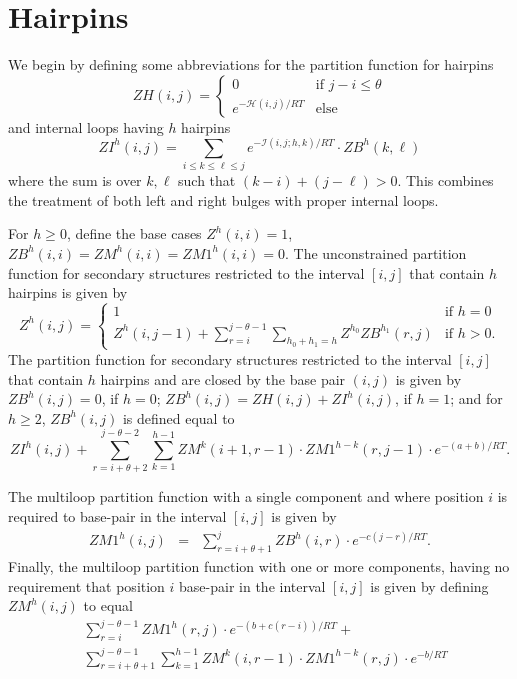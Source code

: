 \section{Hairpins}
\label{section:hairpinPartitionFunction}



We begin by defining some abbreviations for the partition function for
hairpins
\[
ZH(i,j) =
\left\{ \begin{array}{ll}
0 &\mbox{if $j-i \leq \theta$}\\
e^{-\mathcal{H}(i,j)/RT} &\mbox{else}
\end{array} \right.
\]
and internal loops having $h$ hairpins
\[
ZI^h(i,j) =  \displaystyle\sum_{i \leq k \leq \ell \leq j}
e^{-\mathcal{I}(i,j;h,k)/RT} \cdot ZB^h(k,\ell)
\]
where the sum is over $k,\ell$ such that $(k-i)+(j-\ell)>0$. This combines the
treatment of both left and right bulges with proper internal loops.

For $h\geq 0$, define the base cases $Z^h(i,i)=1$,
$ZB^h(i,i)= ZM^h(i,i)= ZM1^h(i,i)=0$.
The unconstrained partition function for secondary structures
restricted to the interval $[i,j]$ that contain $h$ hairpins is given by
\[
Z^h(i,j) =
\left\{ \begin{array}{ll}
1 &\mbox{if $h=0$}\\
Z^h(i,j-1) + \sum_{r=i}^{j-\theta-1} \sum_{h_0+h_1=h}
Z^{h_0} ZB^{h_1}(r,j) &\mbox{if $h>0$}.
\end{array} \right.
\]
The partition function for secondary structures restricted to the
interval $[i,j]$ that contain $h$ hairpins and are closed by
the base pair $(i,j)$ is given by
$ZB^h(i,j) = 0$, if $h=0$;
$ZB^h(i,j) = ZH(i,j) + ZI^h(i,j)$, if $h=1$; and for $h\geq 2$,
$ZB^h(i,j)$ is defined equal to
\[
ZI^h(i,j) + \sum_{r=i+\theta+2}^{j-\theta-2} \sum_{k=1}^{h-1}
     ZM^{k}(i+1,r-1) \cdot ZM1^{h-k}(r,j-1) \cdot e^{-(a+b)/RT}.
\]

The multiloop partition function with a single component and where
position $i$ is required to base-pair in the interval $[i,j]$ is given by
\begin{eqnarray}
ZM1^{h}(i,j) &= &
\displaystyle\sum_{r=i+\theta+1}^j ZB^h(i,r) \cdot
e^{-c(j-r)/RT} .
\end{eqnarray}
Finally, the multiloop partition function with one or more components,
having no requirement that position $i$ base-pair in the interval $[i,j]$
is given by defining $ZM^{h}(i,j)$ to equal
\begin{eqnarray}
&\displaystyle\sum_{r=i}^{j-\theta-1}  ZM1^{h}(r,j) \cdot
e^{-(b+c(r-i))/RT}  + \\
&\displaystyle\sum_{r=i+\theta+1}^{j-\theta-1} \displaystyle\sum_{k=1}^{h-1}
ZM^{k}(i,r-1) \cdot ZM1^{h-k}(r,j) \cdot e^{-b/RT}  \nonumber
\end{eqnarray}

